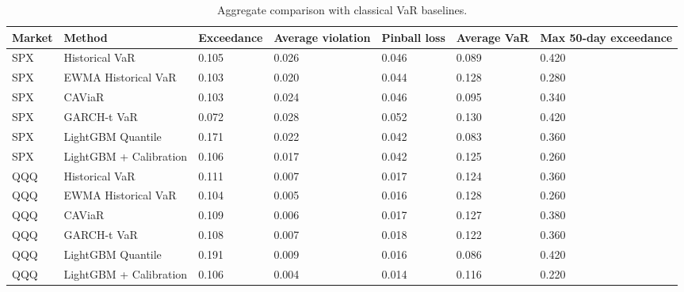 \begin{table}
\caption{Aggregate comparison with classical VaR baselines.}
\label{tab:baseline_pooled_generated}
\begin{tabular}{lllllll}
\toprule
Market & Method & Exceedance & Average violation & Pinball loss & Average VaR & Max 50-day exceedance \\
\midrule
SPX & Historical VaR & 0.105 & 0.026 & 0.046 & 0.089 & 0.420 \\
SPX & EWMA Historical VaR & 0.103 & 0.020 & 0.044 & 0.128 & 0.280 \\
SPX & CAViaR & 0.103 & 0.024 & 0.046 & 0.095 & 0.340 \\
SPX & GARCH-t VaR & 0.072 & 0.028 & 0.052 & 0.130 & 0.420 \\
SPX & LightGBM Quantile & 0.171 & 0.022 & 0.042 & 0.083 & 0.360 \\
SPX & LightGBM + Calibration & 0.106 & 0.017 & 0.042 & 0.125 & 0.260 \\
QQQ & Historical VaR & 0.111 & 0.007 & 0.017 & 0.124 & 0.360 \\
QQQ & EWMA Historical VaR & 0.104 & 0.005 & 0.016 & 0.128 & 0.260 \\
QQQ & CAViaR & 0.109 & 0.006 & 0.017 & 0.127 & 0.380 \\
QQQ & GARCH-t VaR & 0.108 & 0.007 & 0.018 & 0.122 & 0.360 \\
QQQ & LightGBM Quantile & 0.191 & 0.009 & 0.016 & 0.086 & 0.420 \\
QQQ & LightGBM + Calibration & 0.106 & 0.004 & 0.014 & 0.116 & 0.220 \\
\bottomrule
\end{tabular}
\end{table}
